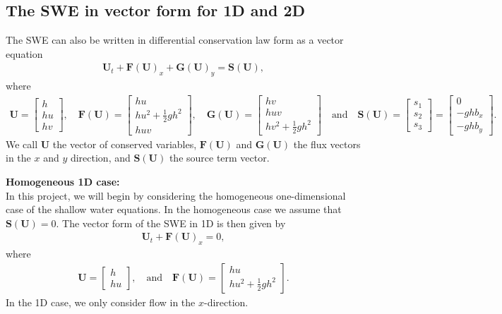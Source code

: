 \subsection{The SWE in vector form for 1D and 2D}
The SWE can also be written in differential conservation law form as a vector equation
\begin{align}
    \mathbf{U}_t + \mathbf{F(U)}_x + \mathbf{G(U)}_y = \mathbf{S(U)},
\end{align}
where 
\begin{align*}
    \mathbf{U} = \begin{bmatrix}
        h \\
        hu \\
        hv
    \end{bmatrix},
    \quad 
    \mathbf{F(U)} = \begin{bmatrix}
        hu \\
        hu^2 + \frac{1}{2}gh^2 \\
        huv
    \end{bmatrix},
    \quad
    \mathbf{G(U)} = \begin{bmatrix}
        hv \\
        huv \\
        hv^2 + \frac{1}{2}gh^2
    \end{bmatrix}
    \quad \text{and} \quad
    \mathbf{S(U)} = \begin{bmatrix}
        s_1 \\
        s_2 \\
        s_3
    \end{bmatrix} = 
    \begin{bmatrix}
        0 \\
        -gh b_x \\
        -gh b_y
    \end{bmatrix}
    .
\end{align*}
We call $\mathbf{U}$ the vector of conserved variables, $\mathbf{F(U)}$ and $\mathbf{G(U)}$ the flux vectors in the $x$ and $y$ direction, and $\mathbf{S(U)}$ the source term vector.

\noindent \textbf{Homogeneous 1D case:}\\
In this project, we will begin by considering the homogeneous one-dimensional case of the shallow water equations.
In the homogeneous case we assume that $\mathbf{S(U)} = 0$.
The vector form of the SWE in 1D is then given by
\begin{align*}
    \mathbf{U}_t + {\mathbf{F(U)}}_x = 0,
\end{align*}
where 
\begin{align*}
    \mathbf{U} = \begin{bmatrix}
        h \\
        hu
    \end{bmatrix},
    \quad
    \text{and} \quad
    \mathbf{F(U)} = \begin{bmatrix}
        hu \\
        hu^2 + \frac{1}{2}gh^2
    \end{bmatrix}.
\end{align*}
In the 1D case, we only consider flow in the $x$-direction.

